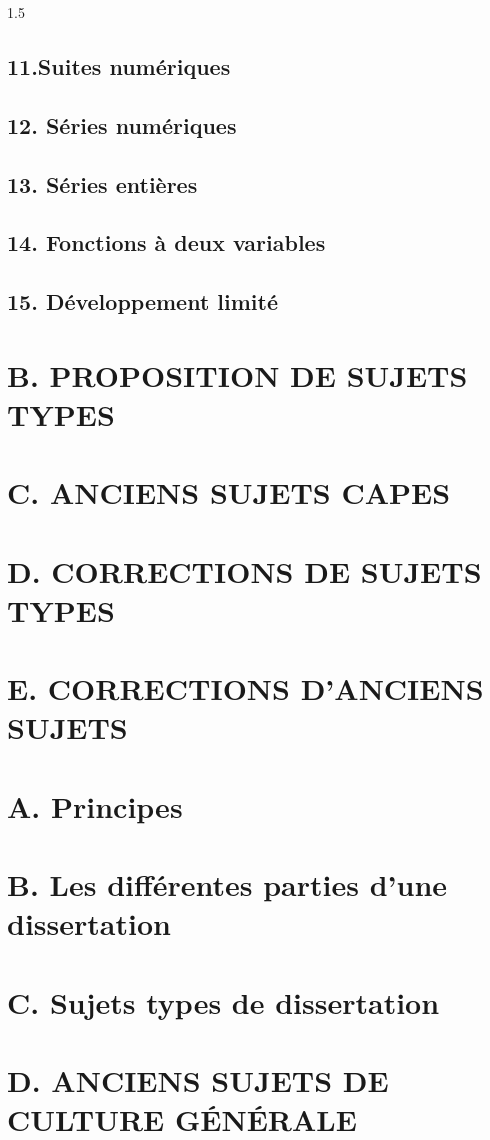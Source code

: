 \documentclass[12pt]{article}
\begin{document}
\begin{spacing}{1.5}
\subsection*{11.Suites numériques}
\subsection*{12. Séries numériques}
\subsection*{13. Séries entières}
\subsection*{14. Fonctions à deux variables}
\subsection*{15. Développement limité}
\section*{\textbf{B. PROPOSITION DE SUJETS TYPES}}
\section*{\textbf{C. ANCIENS SUJETS CAPES}}
\section*{\textbf{D. CORRECTIONS DE SUJETS TYPES}}
\section*{\textbf{E. CORRECTIONS D'ANCIENS SUJETS}}
\section*{A. Principes}
\section*{B. Les différentes parties d'une dissertation}
\section*{C. Sujets types de dissertation}
\section*{\textbf{D. ANCIENS SUJETS DE CULTURE GÉNÉRALE}}

\end{spacing}
\end{document}
